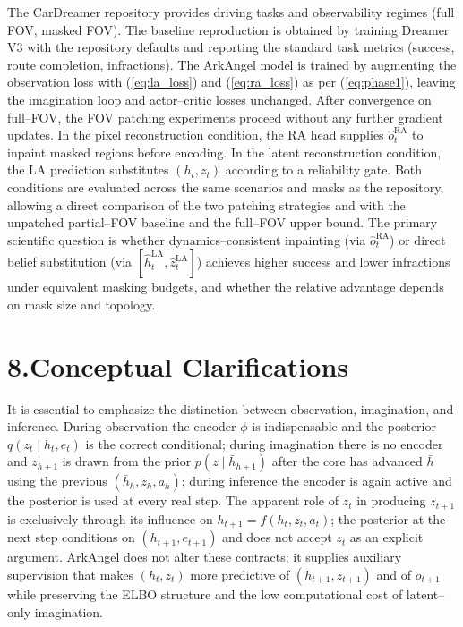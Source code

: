 \documentclass[11pt]{article}
\begin{document}
The CarDreamer repository provides driving tasks and observability regimes (full FOV, masked FOV). The baseline reproduction is obtained by training Dreamer\,V3 with the repository defaults and reporting the standard task metrics (success, route completion, infractions). The ArkAngel model is trained by augmenting the observation loss with (\ref{eq:la_loss}) and (\ref{eq:ra_loss}) as per (\ref{eq:phase1}), leaving the imagination loop and actor--critic losses unchanged. After convergence on full--FOV, the FOV patching experiments proceed without any further gradient updates. In the pixel reconstruction condition, the RA head supplies $\hat o_{t}^{\mathrm{RA}}$ to inpaint masked regions before encoding. In the latent reconstruction condition, the LA prediction substitutes $(h_t,z_t)$ according to a reliability gate. Both conditions are evaluated across the same scenarios and masks as the repository, allowing a direct comparison of the two patching strategies and with the unpatched partial--FOV baseline and the full--FOV upper bound. The primary scientific question is whether dynamics--consistent inpainting (via $\hat o_{t}^{\mathrm{RA}}$) or direct belief substitution (via $[\hat h_t^{\mathrm{LA}},\hat z_t^{\mathrm{LA}}]$) achieves higher success and lower infractions under equivalent masking budgets, and whether the relative advantage depends on mask size and topology.

\section*{8.\quad Conceptual Clarifications}

It is essential to emphasize the distinction between observation, imagination, and inference. During observation the encoder $\phi$ is indispensable and the posterior $q(z_t\mid h_t,e_t)$ is the correct conditional; during imagination there is no encoder and $z_{h+1}$ is drawn from the prior $p(z\mid \bar h_{h+1})$ after the core has advanced $\bar h$ using the previous $(\bar h_h,\bar z_h,\bar a_h)$; during inference the encoder is again active and the posterior is used at every real step. The apparent role of $z_t$ in producing $z_{t+1}$ is exclusively through its influence on $h_{t+1}=f(h_t,z_t,a_t)$; the posterior at the next step conditions on $(h_{t+1},e_{t+1})$ and does not accept $z_t$ as an explicit argument. ArkAngel does not alter these contracts; it supplies auxiliary supervision that makes $(h_t,z_t)$ more predictive of $(h_{t+1},z_{t+1})$ and of $o_{t+1}$ while preserving the ELBO structure and the low computational cost of latent--only imagination.
\end{document}
